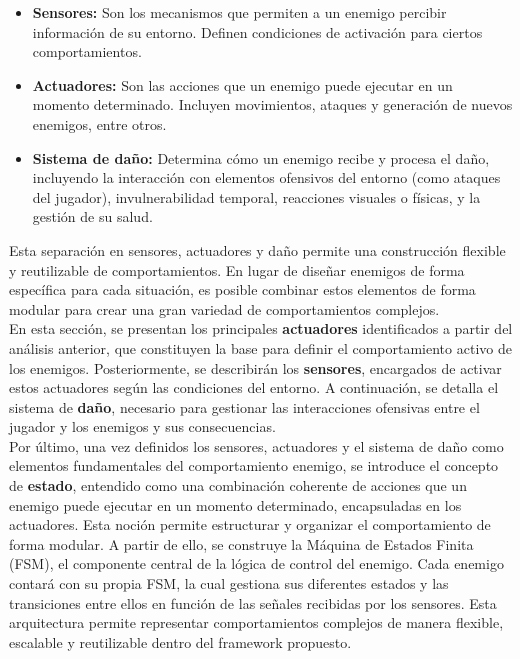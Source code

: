 \begin{itemize}
  \item \textbf{Sensores:} Son los mecanismos que permiten a un enemigo percibir información de su entorno. Definen condiciones de activación para ciertos comportamientos.
  \item \textbf{Actuadores:} Son las acciones que un enemigo puede ejecutar en un momento determinado. Incluyen movimientos, ataques y generación de nuevos enemigos, entre otros.
  \item \textbf{Sistema de daño:} Determina cómo un enemigo recibe y procesa el daño, incluyendo la interacción con elementos ofensivos del entorno (como ataques del jugador), invulnerabilidad temporal, reacciones visuales o físicas, y la gestión de su salud.
\end{itemize}

Esta separación en sensores, actuadores y daño permite una construcción flexible y reutilizable de comportamientos. En lugar de diseñar enemigos de forma específica para cada situación, es posible combinar estos elementos de forma modular para crear una gran variedad de comportamientos complejos.\\

En esta sección, se presentan los principales \textbf{actuadores} identificados a partir del análisis anterior, que constituyen la base para definir el comportamiento activo de los enemigos. Posteriormente, se describirán los \textbf{sensores}, encargados de activar estos actuadores según las condiciones del entorno. A continuación, se detalla el sistema de \textbf{daño}, necesario para gestionar las interacciones ofensivas entre el jugador y los enemigos y sus consecuencias.\\

Por último, una vez definidos los sensores, actuadores y el sistema de daño como elementos fundamentales del comportamiento enemigo, se introduce el concepto de \textbf{estado}, entendido como una combinación coherente de acciones que un enemigo puede ejecutar en un momento determinado, encapsuladas en los actuadores. Esta noción permite estructurar y organizar el comportamiento de forma modular. A partir de ello, se construye la Máquina de Estados Finita (FSM), el componente central de la lógica de control del enemigo. Cada enemigo contará con su propia FSM, la cual gestiona sus diferentes estados y las transiciones entre ellos en función de las señales recibidas por los sensores. Esta arquitectura permite representar comportamientos complejos de manera flexible, escalable y reutilizable dentro del framework propuesto.\\

